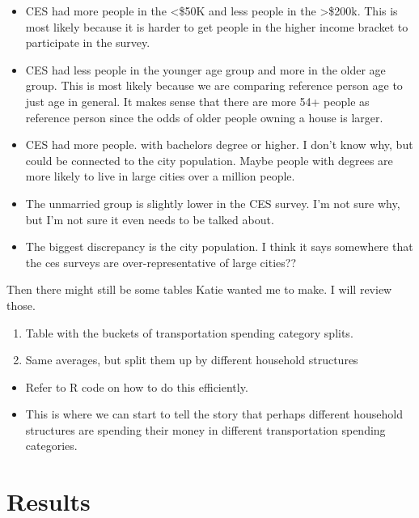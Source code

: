 \documentclass[
]{agujournal2019}
\providecommand{\tightlist}{%
  \setlength{\itemsep}{0pt}\setlength{\parskip}{0pt}}
\begin{document}
\begin{itemize}
\item
  CES had more people in the \textless\$50K and less people in the
  \textgreater\$200k. This is most likely because it is harder to get
  people in the higher income bracket to participate in the survey.
\item
  CES had less people in the younger age group and more in the older age
  group. This is most likely because we are comparing reference person
  age to just age in general. It makes sense that there are more 54+
  people as reference person since the odds of older people owning a
  house is larger.
\item
  CES had more people. with bachelors degree or higher. I don't know
  why, but could be connected to the city population. Maybe people with
  degrees are more likely to live in large cities over a million people.
\item
  The unmarried group is slightly lower in the CES survey. I'm not sure
  why, but I'm not sure it even needs to be talked about.
\item
  The biggest discrepancy is the city population. I think it says
  somewhere that the ces surveys are over-representative of large
  cities??
\end{itemize}

Then there might still be some tables Katie wanted me to make. I will
review those.

\begin{enumerate}
\def\labelenumi{\arabic{enumi}.}
\setcounter{enumi}{2}
\tightlist
\item
  Table with the buckets of transportation spending category splits.
\item
  Same averages, but split them up by different household structures
\end{enumerate}

\begin{itemize}
\tightlist
\item
  Refer to R code on how to do this efficiently.
\item
  This is where we can start to tell the story that perhaps different
  household structures are spending their money in different
  transportation spending categories.
\end{itemize}

\section{Results}\label{results}
\end{document}
